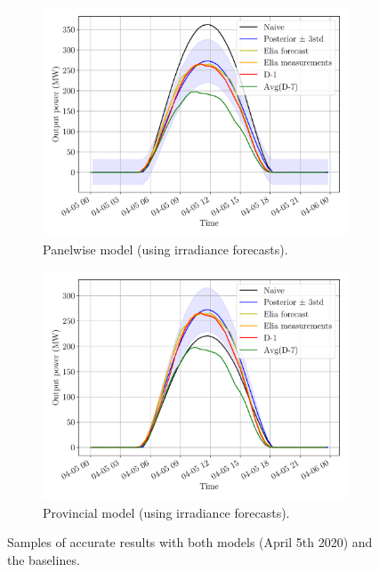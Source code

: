 \documentclass[a4paper, 12pt]{article}
\begin{document}
\begin{figure}[H]
	\centering
	\begin{subfigure}{0.48\textwidth}
		\centering
		\includegraphics[width=\textwidth]{resources/pdf/solar_panelwise_START_FOR_05-04-2020.pdf}
		\caption{Panelwise model (using irradiance forecasts).}
		\label{fig:panelwise_good_2}
	\end{subfigure}
	\hspace{0.5em}
	\begin{subfigure}{0.48\textwidth}
		\centering
		\includegraphics[width=\textwidth]{resources/pdf/solar_provincial_START_FOR_05-04-2020.pdf}
		\caption{Provincial model (using irradiance forecasts).}
		\label{fig:provincial_good_2}
	\end{subfigure}
	\caption{Samples of accurate results with both models (April 5th 2020) and the baselines.}
	\label{fig:good_results_april_5th}
\end{figure}
\end{document}

